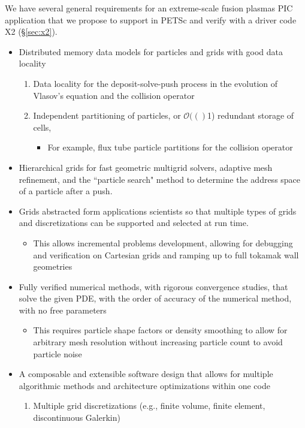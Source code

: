 \documentclass[review]{siamart}
\newcommand{\Order}[1]{\ensuremath{\mathcal{O}(#1)}}    %
\begin{document}
We have several general requirements for an extreme-scale fusion plasmas PIC application that we propose to support in PETSc and verify with a driver code X2 (\S\ref{sec:x2}).
\begin{itemize}
\item Distributed memory data models for particles and grids with good data locality
\begin{enumerate}
\item Data locality for the deposit-solve-push process in the evolution of Vlasov's equation and the collision operator
\item Independent partitioning of particles, or \Order(1) redundant storage of cells,
\begin{itemize}
\item For example, flux tube particle partitions for the collision operator
\end{itemize}
\end{enumerate}
\item Hierarchical grids for fast geometric multigrid solvers, adaptive mesh refinement, and the ``particle search" method to determine the address space of a particle after a push.
\item Grids abstracted form applications scientists so that multiple types of grids and discretizations can be supported and selected at run time.
\begin{itemize}
\item This allows incremental problems development, allowing for debugging and verification on Cartesian grids and ramping up to full tokamak wall geometries 
\end{itemize}
\item Fully verified numerical methods, with rigorous convergence studies, that solve the given PDE, with the order of accuracy of the numerical method, with no free parameters
\begin{itemize}
\item This requires particle shape factors or density smoothing to allow for arbitrary mesh resolution without increasing particle count to avoid particle noise
\end{itemize}
\item A composable and extensible software design that allows for multiple algorithmic methods and architecture optimizations within one code
\begin{enumerate}
\item Multiple grid discretizations (e.g., finite volume, finite element, discontinuous Galerkin)

\end{enumerate}
\end{itemize}
\end{document}

